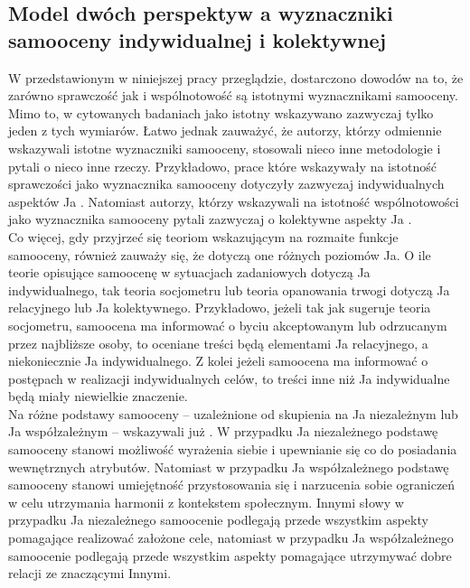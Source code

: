 \documentclass[man]{apa6}
\begin{document}
\newpage
\subsection{Model dwóch perspektyw a wyznaczniki samooceny indywidualnej i kolektywnej}

W przedstawionym w niniejszej pracy przeglądzie, dostarczono dowodów na to, że zarówno sprawczość jak i wspólnotowość są istotnymi wyznacznikami samooceny. Mimo to, w cytowanych badaniach jako istotny wskazywano zazwyczaj tylko jeden z tych wymiarów. Łatwo jednak zauważyć, że autorzy, którzy odmiennie wskazywali istotne wyznaczniki samooceny, stosowali nieco inne metodologie i pytali o nieco inne rzeczy. Przykładowo, prace które wskazywały na istotność sprawczości jako wyznacznika samooceny dotyczyły zazwyczaj indywidualnych aspektów Ja \parencite[np., ][]{wojciszke2011self}. Natomiast autorzy, którzy wskazywali na istotność wspólnotowości jako wyznacznika samooceny pytali zazwyczaj o kolektywne aspekty Ja \parencite[np., ][]{leach2007group, ellemers2008better}. \\

Co więcej, gdy przyjrzeć się teoriom wskazującym na rozmaite funkcje samooceny, również zauważy się, że dotyczą one różnych poziomów Ja. O ile teorie opisujące samoocenę w sytuacjach zadaniowych \parencite[np., ][]{bandura1994self} dotyczą Ja indywidualnego, tak teoria socjometru \parencite{leary1995self} lub teoria opanowania trwogi \parencite{pyszczynski2004people} dotyczą Ja relacyjnego lub Ja kolektywnego. Przykładowo, jeżeli tak jak sugeruje teoria socjometru, samoocena ma informować o byciu akceptowanym lub odrzucanym przez najbliższe osoby, to oceniane treści będą elementami Ja relacyjnego, a niekoniecznie Ja indywidualnego. Z kolei jeżeli samoocena ma informować o postępach w realizacji indywidualnych celów, to treści inne niż Ja indywidualne będą miały niewielkie znaczenie.\\

Na różne podstawy samooceny -- uzależnione od skupienia na Ja niezależnym lub Ja współzależnym -- wskazywali już \textcite{markus1991culture}. W przypadku Ja niezależnego podstawę samooceny stanowi możliwość wyrażenia siebie i upewnianie się co do posiadania wewnętrznych atrybutów. Natomiast w przypadku Ja współzależnego podstawę samooceny stanowi umiejętność przystosowania się i narzucenia sobie ograniczeń w celu utrzymania harmonii z kontekstem społecznym. Innymi słowy w przypadku Ja niezależnego samoocenie podlegają przede wszystkim aspekty pomagające realizować założone cele, natomiast w przypadku Ja współzależnego samoocenie podlegają przede wszystkim aspekty pomagające utrzymywać dobre relacji ze znaczącymi Innymi.\\
\end{document}
